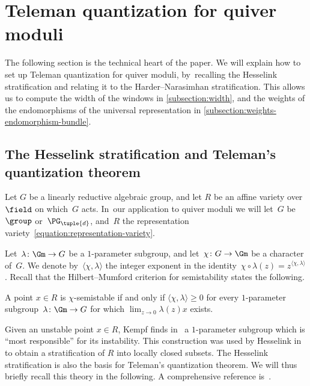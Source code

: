 \section{Teleman quantization for quiver moduli}
\label{section:teleman-for-quiver-moduli}
The following section is the technical heart of the paper.
We will explain how to set up Teleman quantization for quiver moduli, by~recalling the Hesselink stratification
and relating it to the Harder--Narasimhan stratification.
This allows us to compute the width of the windows in \cref{subsection:width},
and the weights of the endomorphisms of the universal representation in \cref{subsection:weights-endomorphism-bundle}.

\subsection{The Hesselink stratification and Teleman's quantization theorem}
\label{subsection:hesselink-and-teleman}
Let $G$ be a linearly reductive algebraic group,
and let $R$ be an affine variety over $\field$ on which~$G$ acts. In~our application to quiver moduli we will let~$G$ be~$\group$ or~$\PG_{\tuple{d}}$,
and~$R$ the representation variety~\eqref{equation:representation-variety}.

Let~$\lambda\colon\Gm\to G$ be a $1$-parameter subgroup,
and let~$\chi\colon G \to \Gm$ be a character of~$G$.
We denote by~$\langle\chi,\lambda\rangle$ the integer exponent in the identity~$\chi \circ \lambda (z) = z^{\langle\chi,\lambda\rangle}$.
Recall that the Hilbert--Mumford criterion for semistability states the following.

\begin{theorem}
\label{theorem:hilbert-mumford}
A point $x \in R$ is $\chi$-semistable if and only if $ \langle\chi,\lambda\rangle \geq 0$
for every $1$-parameter subgroup~$\lambda\colon \Gm \to G$
for which $\lim_{z \to 0} \lambda(z)x$ exists.
\end{theorem}
Given an unstable point $x \in R$, Kempf finds in~\cite{MR0506989} a $1$-parameter subgroup which is
``most responsible'' for its instability.
This construction was used by Hesselink in~\cite{MR0514673}
to obtain a stratification of $R$ into locally closed subsets.
The Hesselink stratification is also the basis for Teleman's quantization theorem.
We will thus briefly recall this theory in the following.
A comprehensive reference is~\cite[\S 12 \& \S 13]{MR0766741}.

